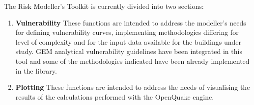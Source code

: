 The Risk Modeller's Toolkit is currently divided into two sections:
\begin{enumerate}
\item \textbf{Vulnerability} These functions are intended to address the modeller's needs for defining vulnerability curves, implementing methodologies differing for level of complexity and for the input data available for the buildings under study. GEM analytical vulnerability guidelines have been integrated in this tool and some of the methodologies indicated have been already implemented in the library.
\item \textbf{Plotting} These functions are intended to address the needs of visualising the results of the calculations performed with the OpenQuake engine. 
\end{enumerate}
